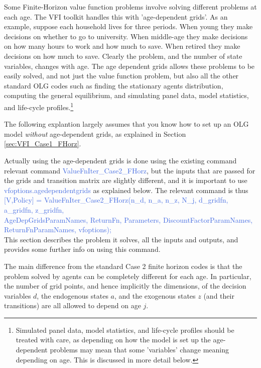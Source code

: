 Some Finite-Horizon value function problems involve solving different problems at each age. The VFI toolkit handles this with 'age-dependent grids'. As an example, suppose each household lives for three periods. When young they make decisions on whether to go to university. When middle-age they make decisions on how many hours to work and how much to save. When retired they make decisions on how much to save. Clearly the problem, and the number of state variables, changes with age. The age dependent grids allows these problems to be easily solved, and not just the value function problem, but also all the other standard OLG codes such as finding the stationary agents distribution, computing the general equilibrium, and simulating panel data, model statistics, and life-cycle profiles.\footnote{Simulated panel data, model statistics, and life-cycle profiles should be treated with care, as depending on how the model is set up the age-dependent problems may mean that some 'variables' change meaning depending on age. This is discussed in more detail below.}

The following explantion largely assumes that you know how to set up an OLG model \textit{without} age-dependent grids, as explained in Section \ref{sec:VFI_Case1_FHorz}.

Actually using the age-dependent grids is done using the existing command relevant command \textcolor{RoyalBlue}{ValueFnIter\_{}Case2\_{}FHorz}, but the inputs that are passed for the grids and transition matrix are slightly different, and it is important to use \textcolor{RoyalBlue}{vfoptions.agedependentgrids} as explained below. The relevant command is thus \\
\textcolor{RoyalBlue}{[V,Policy] = ValueFnIter\_{}Case2\_{}FHorz(n\_{}d, n\_{}a, n\_{}z, N\_{}j, d\_{}gridfn, a\_{}gridfn, z\_{}gridfn, } \\
\indent \indent \textcolor{RoyalBlue}{AgeDepGridsParamNames, ReturnFn, Parameters, DiscountFactorParamNames,} \\
\indent \indent \textcolor{RoyalBlue}{ReturnFnParamNames, vfoptions);} \\
This section describes the problem it solves, all the inputs and outputs, and provides some further info on using this command.

The main difference from the standard Case 2 finite horizon codes is that the problem solved by agents can be completely different for each age. In particular, the number of grid points, and hence implicitly the dimensions, of the decision variables $d$, the endogenous states $a$, and the exogenous states $z$ (and their transitions) are all allowed to depend on age $j$.

